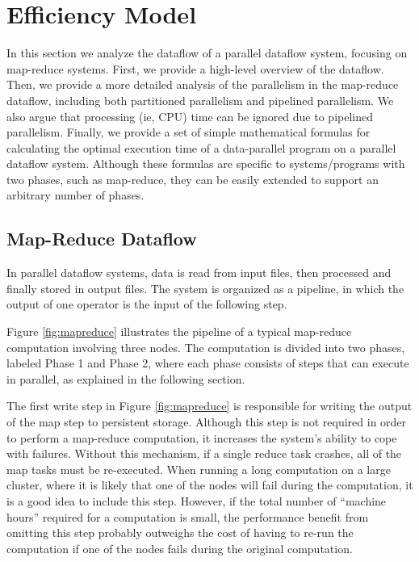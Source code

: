 \documentclass{acm_proc_article-sp}
\begin{document}
\section{Efficiency Model}

In this section we analyze the dataflow of a parallel dataflow system, focusing on map-reduce systems. First, we provide a high-level overview of the dataflow. Then, we provide a more detailed analysis of the parallelism in the map-reduce dataflow, including both partitioned parallelism and pipelined parallelism. We also argue that processing (ie, CPU) time can be ignored due to pipelined parallelism. Finally, we provide a set of simple mathematical formulas for calculating the optimal execution time of a data-parallel program on a parallel dataflow system. Although these formulas are specific to systems/programs with two phases, such as map-reduce, they can be easily extended to support an arbitrary number of phases.

\subsection{Map-Reduce Dataflow}

In parallel dataflow systems, data is read from input files, then processed and finally stored in output files. The system is organized as a pipeline, in which the output of one operator is the input of the following step.

\begin{figure*}
\begin{center}
\caption{A map-reduce dataflow.}
\label{fig:mapreduce}
\end{center}
\end{figure*}

Figure \ref{fig:mapreduce} illustrates the pipeline of a typical map-reduce computation involving three nodes. The computation is divided into two phases, labeled Phase 1 and Phase 2, where each phase consists of steps that can execute in parallel, as explained in the following section.

The first write step in Figure \ref{fig:mapreduce} is responsible for writing the output of the map step to persistent storage. Although this step is not required in order to perform a map-reduce computation, it increases the system's ability to cope with failures. Without this mechanism, if a single reduce task crashes, all of the map tasks must be re-executed. When running a long computation on a large cluster, where it is likely that one of the nodes will fail during the computation, it is a good idea to include this step. However, if the total number of ``machine hours'' required for a computation is small, the performance benefit from omitting this step probably outweighs the cost of having to re-run the computation if one of the nodes fails during the original computation.
\end{document}
